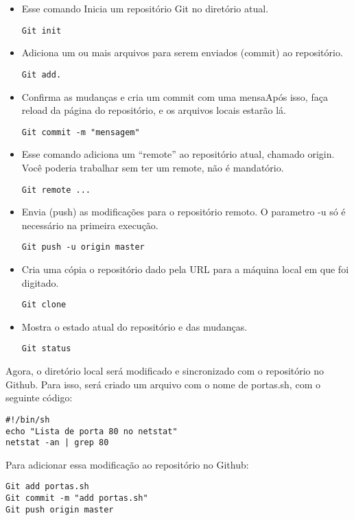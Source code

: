 \begin{itemize}
    \item Esse comando Inicia um repositório Git no 
    diretório atual.
	\begin{lstlisting}
Git init
	\end{lstlisting}
    \item Adiciona um ou mais arquivos para serem 
    enviados (commit) ao repositório.
	\begin{lstlisting}
Git add.
	\end{lstlisting}
    \item Confirma as mudanças e 
    cria um commit com uma mensaApós isso, faça reload da 
    página do repositório, e os arquivos locais estarão lá.
	\begin{lstlisting}
Git commit -m "mensagem"
	\end{lstlisting}    
    \item Esse comando adiciona um “remote” 
    ao repositório atual, chamado origin. Você poderia trabalhar 
    sem ter um remote, não é mandatório.
	\begin{lstlisting}
Git remote ...
	\end{lstlisting}
    \item Envia (push) as modificações 
    para o repositório remoto. O parametro -u só é necessário na 
    primeira execução.
	\begin{lstlisting}
Git push -u origin master
	\end{lstlisting}
    \item Cria uma cópia o repositório dado pela URL 
    para a máquina local em que foi digitado.
	\begin{lstlisting}
Git clone
	\end{lstlisting}
    \item Mostra o estado atual do repositório e 
    das mudanças.
	\begin{lstlisting}
Git status
	\end{lstlisting}
\end{itemize}
Agora, o diretório local será modificado e sincronizado 
com o repositório no Github. Para isso, será criado um 
arquivo com o nome de portas.sh, com o seguinte código:
    \begin{lstlisting}
#!/bin/sh
echo "Lista de porta 80 no netstat"
netstat -an | grep 80
    \end{lstlisting}
 Para adicionar essa modificação ao repositório no Github:
     \begin{lstlisting}
Git add portas.sh
Git commit -m "add portas.sh"
Git push origin master
    \end{lstlisting}
